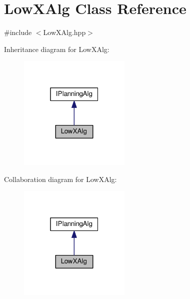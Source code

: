 \hypertarget{classLowXAlg}{}\section{Low\+X\+Alg Class Reference}
\label{classLowXAlg}


{\ttfamily \#include $<$Low\+X\+Alg.\+hpp$>$}



Inheritance diagram for Low\+X\+Alg\+:
\nopagebreak
\begin{figure}[H]
\begin{center}
\leavevmode
\includegraphics[width=151pt]{classLowXAlg__inherit__graph}
\end{center}
\end{figure}


Collaboration diagram for Low\+X\+Alg\+:
\nopagebreak
\begin{figure}[H]
\begin{center}
\leavevmode
\includegraphics[width=151pt]{classLowXAlg__coll__graph}
\end{center}
\end{figure}
